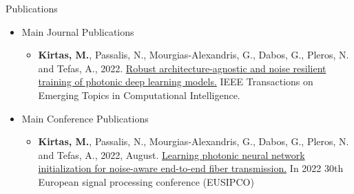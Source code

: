 \begin{frame}{Publications}
\begin{itemize}
    \item Main Journal Publications
    \begin{itemize}
        \item {\scriptsize \textbf{Kirtas, M.}, Passalis, N., Mourgias-Alexandris, G., Dabos, G.,
      Pleros, N. and Tefas, A., 2022. \href{https://ieeexplore.ieee.org/document/9815870}{Robust architecture-agnostic and noise resilient training of photonic deep learning models.} IEEE Transactions on Emerging Topics in Computational Intelligence.} 
    \end{itemize}
    \item Main Conference Publications 
        \begin{itemize}
        \item {\scriptsize \textbf{Kirtas, M.}, Passalis, N., Mourgias-Alexandris, G., Dabos, G., Pleros, N. and Tefas, A., 2022, August. \href{https://ieeexplore.ieee.org/abstract/document/9909781}{Learning photonic neural network initialization for noise-aware end-to-end fiber transmission.} In 2022 30th European signal processing conference (EUSIPCO)}
    \end{itemize}

    
\end{itemize}
\end{frame}




